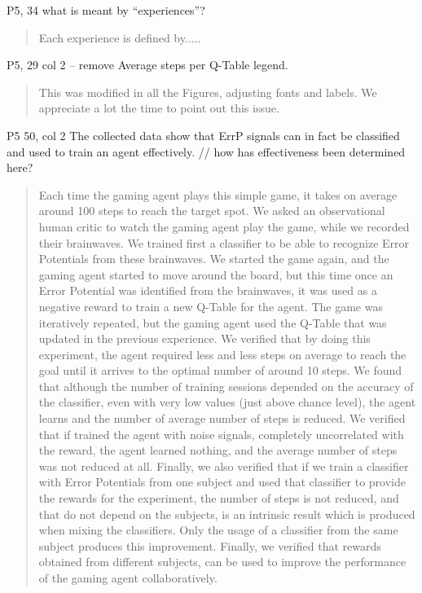 \documentclass[journal,onecolumn,12pt]{IEEEtran}
\begin{document}
P5, 34 what is meant by “experiences”?

\vspace{2em}
\begin{quotation}
{\color{blue}
Each experience is defined by.....
}
\end{quotation}
\vspace{2em}

P5, 29 col 2 – remove Average steps per Q-Table legend.

\vspace{2em}
\begin{quotation}
{\color{blue}
This was modified in all the Figures, adjusting fonts and labels.  We appreciate a lot the time to point out this issue.
}
\end{quotation}
\vspace{2em}

P5 50, col 2 The collected data show that ErrP signals can in fact be classified and used to train an agent effectively.
// how has effectiveness been determined here?

\vspace{2em}
\begin{quotation}
{\color{blue}
Each time the gaming agent plays this simple game, it takes on average around 100 steps to reach the target spot.   We asked an observational human critic to watch the gaming agent play the game, while we recorded their brainwaves.  We trained first a classifier to be able to recognize Error Potentials from these brainwaves.  We started the game again, and the gaming agent started to move around the board, but this time once an Error Potential was identified from the brainwaves, it was used as a negative reward to train a new Q-Table for the agent.  The game was iteratively repeated, but the gaming agent used the Q-Table that was updated in the previous experience.
We verified that by doing this experiment, the agent required less and less steps on average to reach the goal until it arrives to the optimal number of around 10 steps.  We found that although the number of training sessions depended on the accuracy of the classifier, even with very low values (just above chance level), the agent learns and the number of average number of steps is reduced.
We verified that if trained the agent with noise signals, completely uncorrelated with the reward, the agent learned nothing, and the average number of steps was not reduced at all.
Finally, we also verified that if we train a classifier with Error Potentials from one subject and used that classifier to provide the rewards for the experiment, the number of steps is not reduced, and that do not depend on the subjects, is an intrinsic result which is produced when mixing the classifiers.  Only the usage of a classifier from the same subject produces this improvement.
Finally, we verified that rewards obtained from different subjects, can be used to improve the performance of the gaming agent collaboratively.
}
\end{quotation}
\vspace{2em}
\end{document}
